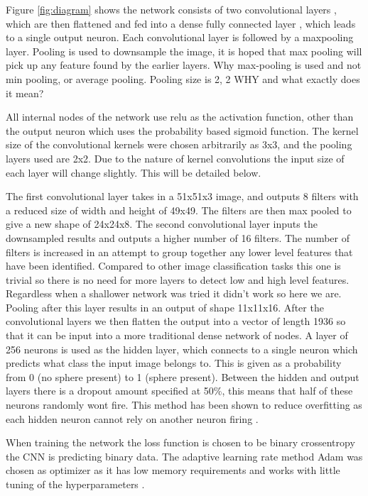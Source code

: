 \documentclass{article}
\begin{document}
Figure \ref{fig:diagram} shows the network consists of two convolutional layers
, which are then flattened and fed into  a dense fully connected layer
, which leads to a single output neuron.
Each convolutional layer is followed by a maxpooling layer.
Pooling is used to downsample the image, it is hoped that max pooling will pick up any feature found by the earlier layers.
Why max-pooling is used and not min pooling, or average pooling.
Pooling size is 2, 2 WHY and what exactly does it mean?

All internal nodes of the network use relu as the activation function, other than the output neuron which uses the probability based sigmoid function.
The kernel size of the convolutional kernels were chosen arbitrarily as 3x3, and the pooling layers used are 2x2.
Due to the nature of kernel convolutions the input size of each layer will change slightly.
This will be detailed below.

The first convolutional layer takes in a 51x51x3 image, and outputs 8 filters with a reduced size of width and height of 49x49.
The filters are then max pooled to give a new shape of 24x24x8.
The second convolutional layer inputs the downsampled results and outputs a higher number of 16 filters.
The number of filters is increased in an attempt to group together any lower level features that have been identified.
Compared to other image classification tasks this one is trivial so there is no need for more layers to detect low and high level features.
Regardless when a shallower network was tried it didn't work so here we are.  
Pooling after this layer results in an output of shape 11x11x16.
After the convolutional layers we then flatten the output into a vector of length 1936 so that it can be input into a more traditional dense network of nodes.
A layer of 256 neurons is used as the hidden layer, which connects to a single neuron which predicts what class the input image belongs to.
This is given as a probability from 0 (no sphere present) to 1 (sphere present).
Between the hidden and output layers there is a dropout amount specified at 50\%, this means that half of these neurons randomly wont fire.
This method has been shown to reduce overfitting as each hidden neuron cannot rely on another neuron firing \cite{hinton2012improving}. %

When training the network the loss function is chosen to be binary crossentropy the CNN is predicting binary data.
The adaptive learning rate method Adam was chosen as optimizer as it has low memory requirements and works with little tuning of the hyperparameters \cite{Chengwei_2018}.
\end{document}
